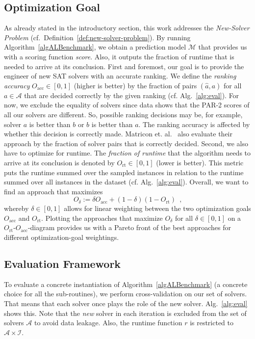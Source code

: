 \documentclass[runningheads]{llncs}
\begin{document}
\subsection{Optimization Goal}
\label{sec:goal}
As already stated in the introductory section, this work addresses the \emph{New-Solver Problem} (cf.~Definition~\ref{def:new-solver-problem}).
By running Algorithm~\ref{algALBenchmark}, we obtain a prediction model $\mathcal{M}$ that provides us with a scoring function \emph{score}.
Also, it outputs the fraction of runtime that is needed to arrive at its conclusion.
First and foremost, our goal is to provide the engineer of new SAT solvers with an accurate ranking.
We define the \emph{ranking accuracy} $O_{\operatorname{acc}} \in \left[0, 1\right]$ (higher is better) by the fraction of pairs $\left(\hat{a}, a\right)$ for all $a \in \mathcal{A}$ that are decided correctly by the given ranking (cf. Alg.~\ref{alg:eval}).
For now, we exclude the equality of solvers since data shows that the PAR-2 scores of all our solvers are different.
So, possible ranking decisions may be, for example, solver $a$ is better than $b$ or $b$ is better than $a$.
The ranking accuracy is affected by whether this decision is correctly made.
Matricon et. al.~\cite{MatriconAFSH21} also evaluate their approach by the fraction of solver pairs that is correctly decided.
Second, we also have to optimize for runtime.
The \emph{fraction of runtime} that the algorithm needs to arrive at its conclusion is denoted by $O_{\operatorname{rt}} \in \left[0, 1\right]$ (lower is better).
This metric puts the runtime summed over the sampled instances in relation to the runtime summed over all instances in the dataset (cf. Alg.~\ref{alg:eval}).
Overall, we want to find an approach that maximizes
\begin{equation}
  O_\delta := \delta O_{\operatorname{acc}} + \left(1 - \delta\right) \left(1 - O_{\operatorname{rt}}\right) \enspace \textrm{,}
  \label{eq:opt}
\end{equation} 
whereby $\delta \in \left[0, 1\right]$ allows for linear weighting between the two optimization goals $O_{\operatorname{acc}}$ and $O_{\operatorname{rt}}$.
Plotting the approaches that maximize $O_\delta$ for all $\delta \in \left[0, 1\right]$ on a $O_{\operatorname{rt}}$-$O_{\operatorname{acc}}$-diagram provides us with a Pareto front of the best approaches for different optimization-goal weightings.

\subsection{Evaluation Framework}
\label{sec:evalframe}
To evaluate a concrete instantiation of Algorithm~\ref{algALBenchmark} (a concrete choice for all the sub-routines), we perform cross-validation on our set of solvers.
That means that each solver once plays the role of the new solver.
Alg.~\ref{alg:eval} shows this.
Note that the \emph{new} solver in each iteration is excluded from the set of solvers $\mathcal{A}$ to avoid data leakage.
Also, the runtime function $r$ is restricted to $\mathcal{A} \times \mathcal{I}$.
\end{document}
